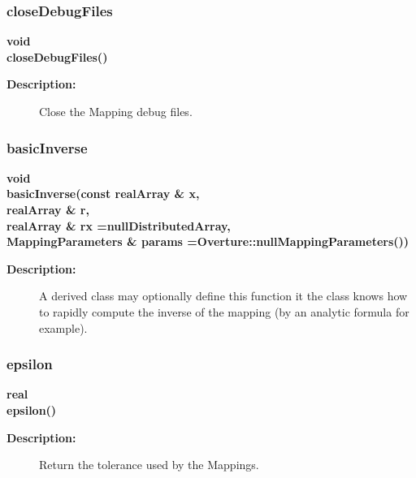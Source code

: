 \subsubsection{closeDebugFiles}
 
\begin{flushleft} \textbf{%
void  \\ 
\settowidth{\MappingIncludeArgIndent}{closeDebugFiles(}%
closeDebugFiles()
}\end{flushleft}
\begin{description}
\item[{\bf Description:}] 
    Close the Mapping debug files.
\end{description}
\subsubsection{basicInverse}
 
\begin{flushleft} \textbf{%
void  \\ 
\settowidth{\MappingIncludeArgIndent}{basicInverse(}%
basicInverse(const realArray \& x, \\ 
\hspace{\MappingIncludeArgIndent}realArray \& r, \\ 
\hspace{\MappingIncludeArgIndent}realArray \& rx  =nullDistributedArray, \\ 
MappingParameters \& params  =Overture::nullMappingParameters()) 
}\end{flushleft}
\begin{description}
\item[{\bf Description:}] 
    A derived class may optionally define this function it the class knows how
  to rapidly compute the inverse of the mapping (by an analytic formula for example).
\end{description}
\subsubsection{epsilon}
 
\begin{flushleft} \textbf{%
real  \\ 
\settowidth{\MappingIncludeArgIndent}{epsilon(}%
epsilon()
}\end{flushleft}
\begin{description}
\item[{\bf Description:}] 
    Return the tolerance used by the Mappings.
\end{description}
